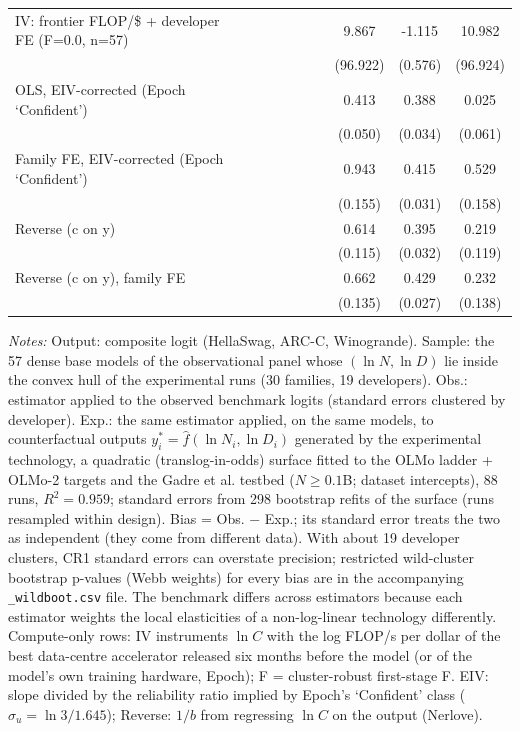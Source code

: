 \begin{table}[!htbp]
\begin{threeparttable}
\begin{tabular}{lccccccccc}
IV: frontier FLOP/\$ + developer FE (F=0.0, n=57) &  &  &  &  &  &  & 9.867 & -1.115 & 10.982 \\
 &  &  &  &  &  &  & (96.922) & (0.576) & (96.924) \\
OLS, EIV-corrected (Epoch `Confident') &  &  &  &  &  &  & 0.413 & 0.388 & 0.025 \\
 &  &  &  &  &  &  & (0.050) & (0.034) & (0.061) \\
Family FE, EIV-corrected (Epoch `Confident') &  &  &  &  &  &  & 0.943 & 0.415 & 0.529 \\
 &  &  &  &  &  &  & (0.155) & (0.031) & (0.158) \\
Reverse (c on y) &  &  &  &  &  &  & 0.614 & 0.395 & 0.219 \\
 &  &  &  &  &  &  & (0.115) & (0.032) & (0.119) \\
Reverse (c on y), family FE &  &  &  &  &  &  & 0.662 & 0.429 & 0.232 \\
 &  &  &  &  &  &  & (0.135) & (0.027) & (0.138) \\
\bottomrule
\end{tabular}
\begin{tablenotes}[flushleft]
\footnotesize
\item \textit{Notes:} Output: composite logit (HellaSwag, ARC-C, Winogrande). Sample: the 57 dense base models of the observational panel whose $(\ln N,\ln D)$ lie inside the convex hull of the experimental runs (30 families, 19 developers). Obs.: estimator applied to the observed benchmark logits (standard errors clustered by developer). Exp.: the same estimator applied, on the same models, to counterfactual outputs $y^*_i=\hat f(\ln N_i,\ln D_i)$ generated by the experimental technology, a quadratic (translog-in-odds) surface fitted to the OLMo ladder + OLMo-2 targets and the Gadre et al. testbed ($N\geq0.1$B; dataset intercepts), 88 runs, $R^2=0.959$; standard errors from 298 bootstrap refits of the surface (runs resampled within design). Bias = Obs. $-$ Exp.; its standard error treats the two as independent (they come from different data). With about 19 developer clusters, CR1 standard errors can overstate precision; restricted wild-cluster bootstrap p-values (Webb weights) for every bias are in the accompanying \texttt{\_wildboot.csv} file. The benchmark differs across estimators because each estimator weights the local elasticities of a non-log-linear technology differently. Compute-only rows: IV instruments $\ln C$ with the log FLOP/s per dollar of the best data-centre accelerator released six months before the model (or of the model's own training hardware, Epoch); F = cluster-robust first-stage F. EIV: slope divided by the reliability ratio implied by Epoch's `Confident' class ($\sigma_u=\ln 3/1.645$); Reverse: $1/b$ from regressing $\ln C$ on the output (Nerlove).
\end{tablenotes}
\end{threeparttable}
\end{table}
